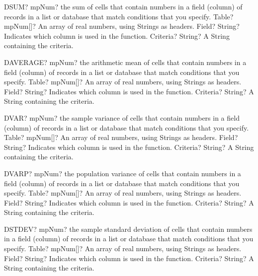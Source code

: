 \documentclass[12pt,a4paper,openany]{book}
\begin{document}
\begin{mpFunctionsExtract}
\mpWorksheetFunctionThreeNotImplemented
{DSUM? mpNum? the sum of cells that contain numbers in a field (column) of records in a list or database that match conditions that you specify.}
{Table? mpNum[]? An array of real numbers, using Strings as headers.}
{Field? String? Indicates which column is used in the function.}
{Criteria? String? A String containing the criteria.}
\end{mpFunctionsExtract}

\begin{mpFunctionsExtract}
\mpWorksheetFunctionThreeNotImplemented
{DAVERAGE? mpNum? the arithmetic mean of cells that contain numbers in a field (column) of records in a list or database that match conditions that you specify.}
{Table? mpNum[]? An array of real numbers, using Strings as headers.}
{Field? String? Indicates which column is used in the function.}
{Criteria? String? A String containing the criteria.}
\end{mpFunctionsExtract}

\begin{mpFunctionsExtract}
\mpWorksheetFunctionThreeNotImplemented
{DVAR? mpNum? the sample variance of cells that contain numbers in a field (column) of records in a list or database that match conditions that you specify.}
{Table? mpNum[]? An array of real numbers, using Strings as headers.}
{Field? String? Indicates which column is used in the function.}
{Criteria? String? A String containing the criteria.}
\end{mpFunctionsExtract}

\begin{mpFunctionsExtract}
\mpWorksheetFunctionThreeNotImplemented
{DVARP? mpNum? the population variance of cells that contain numbers in a field (column) of records in a list or database that match conditions that you specify.}
{Table? mpNum[]? An array of real numbers, using Strings as headers.}
{Field? String? Indicates which column is used in the function.}
{Criteria? String? A String containing the criteria.}
\end{mpFunctionsExtract}

\begin{mpFunctionsExtract}
\mpWorksheetFunctionThreeNotImplemented
{DSTDEV? mpNum? the sample standard deviation of cells that contain numbers in a field (column) of records in a list or database that match conditions that you specify.}
{Table? mpNum[]? An array of real numbers, using Strings as headers.}
{Field? String? Indicates which column is used in the function.}
{Criteria? String? A String containing the criteria.}
\end{mpFunctionsExtract}
\end{document}
